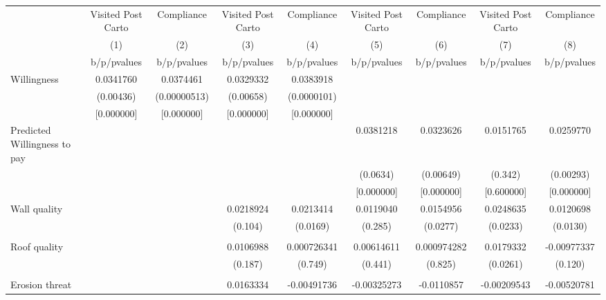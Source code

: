 {
\def\sym#1{\ifmmode^{#1}\else\(^{#1}\)\fi}
\begin{tabular}{l*{8}{c}}
\toprule
                &\multicolumn{1}{c}{Visited Post Carto}&\multicolumn{1}{c}{Compliance}&\multicolumn{1}{c}{Visited Post Carto}&\multicolumn{1}{c}{Compliance}&\multicolumn{1}{c}{Visited Post Carto}&\multicolumn{1}{c}{Compliance}&\multicolumn{1}{c}{Visited Post Carto}&\multicolumn{1}{c}{Compliance}\\
                &\multicolumn{1}{c}{(1)}&\multicolumn{1}{c}{(2)}&\multicolumn{1}{c}{(3)}&\multicolumn{1}{c}{(4)}&\multicolumn{1}{c}{(5)}&\multicolumn{1}{c}{(6)}&\multicolumn{1}{c}{(7)}&\multicolumn{1}{c}{(8)}\\
                &b/p/pvalues&b/p/pvalues&b/p/pvalues&b/p/pvalues&b/p/pvalues&b/p/pvalues&b/p/pvalues&b/p/pvalues\\
\midrule
Willingness     &0.0341760&0.0374461&0.0329332&0.0383918&         &         &         &         \\
                &(0.00436)&(0.00000513)&(0.00658)&(0.0000101)&         &         &         &         \\
                &[0.000000]&[0.000000]&[0.000000]&[0.000000]&         &         &         &         \\
Predicted Willingness to pay&         &         &         &         &0.0381218&0.0323626&0.0151765&0.0259770\\
                &         &         &         &         & (0.0634)&(0.00649)&  (0.342)&(0.00293)\\
                &         &         &         &         &[0.000000]&[0.000000]&[0.600000]&[0.000000]\\
Wall quality    &         &         &0.0218924&0.0213414&0.0119040&0.0154956&0.0248635&0.0120698\\
                &         &         &  (0.104)& (0.0169)&  (0.285)& (0.0277)& (0.0233)& (0.0130)\\
                &         &         &         &         &         &         &         &         \\
Roof quality    &         &         &0.0106988&0.000726341&0.00614611&0.000974282&0.0179332&-0.00977337\\
                &         &         &  (0.187)&  (0.749)&  (0.441)&  (0.825)& (0.0261)&  (0.120)\\
                &         &         &         &         &         &         &         &         \\
Erosion threat  &         &         &0.0163334&-0.00491736&-0.00325273&-0.0110857&-0.00209543&-0.00520781\\

\end{tabular}}
